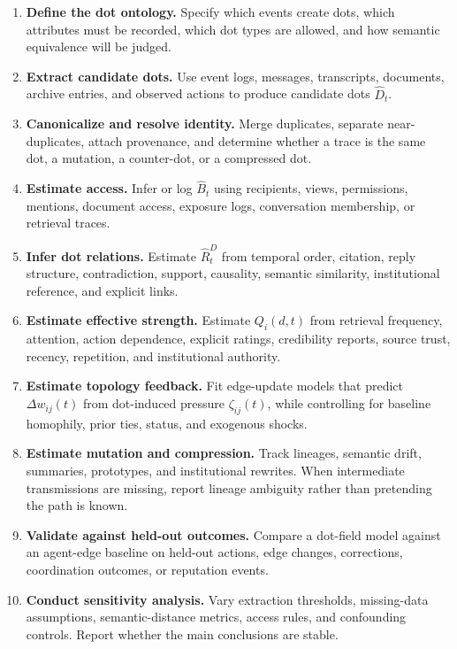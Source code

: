 \documentclass[11pt]{article}
\theoremstyle{remark}
\begin{document}
\begin{enumerate}[label=\textbf{Step \arabic*.},leftmargin=2.2cm]
\item \textbf{Define the dot ontology.} Specify which events create dots,
which attributes must be recorded, which dot types are allowed, and how
semantic equivalence will be judged.
\item \textbf{Extract candidate dots.} Use event logs, messages,
transcripts, documents, archive entries, and observed actions to produce
candidate dots $\widehat D_t$.
\item \textbf{Canonicalize and resolve identity.} Merge duplicates,
separate near-duplicates, attach provenance, and determine whether a
trace is the same dot, a mutation, a counter-dot, or a compressed dot.
\item \textbf{Estimate access.} Infer or log $\widehat B_t$ using
recipients, views, permissions, mentions, document access, exposure logs,
conversation membership, or retrieval traces.
\item \textbf{Infer dot relations.} Estimate $\widehat R_t^D$ from temporal
order, citation, reply structure, contradiction, support, causality,
semantic similarity, institutional reference, and explicit links.
\item \textbf{Estimate effective strength.} Estimate $Q_i(d,t)$ from
retrieval frequency, attention, action dependence, explicit ratings,
credibility reports, source trust, recency, repetition, and
institutional authority.
\item \textbf{Estimate topology feedback.} Fit edge-update models that
predict $\Delta w_{ij}(t)$ from dot-induced pressure $\zeta_{ij}(t)$, while
controlling for baseline homophily, prior ties, status, and exogenous
shocks.
\item \textbf{Estimate mutation and compression.} Track lineages,
semantic drift, summaries, prototypes, and institutional rewrites. When
intermediate transmissions are missing, report lineage ambiguity rather
than pretending the path is known.
\item \textbf{Validate against held-out outcomes.} Compare a dot-field
model against an agent-edge baseline on held-out actions, edge changes,
corrections, coordination outcomes, or reputation events.
\item \textbf{Conduct sensitivity analysis.} Vary extraction thresholds,
missing-data assumptions, semantic-distance metrics, access rules, and
confounding controls. Report whether the main conclusions are stable.
\end{enumerate}
\end{document}
